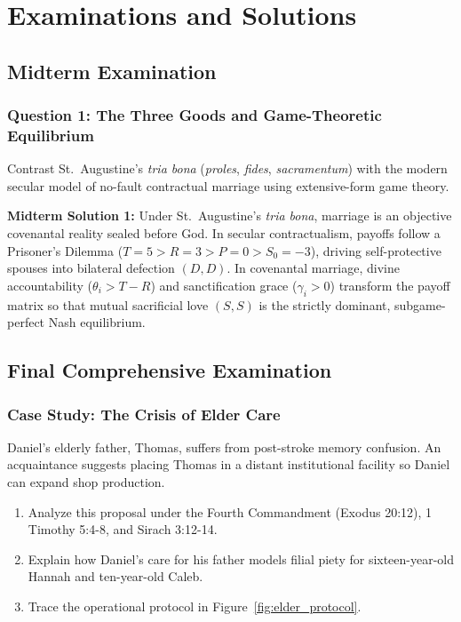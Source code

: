 \documentclass[11pt]{report}
\begin{document}
\chapter{Examinations and Solutions}

\section{Midterm Examination}

\subsection*{Question 1: The Three Goods and Game-Theoretic Equilibrium}
Contrast St.~Augustine's \textit{tria bona} (\textit{proles}, \textit{fides}, \textit{sacramentum}) with the modern secular model of no-fault contractual marriage using extensive-form game theory.

\begin{blackboard}
\textbf{Midterm Solution 1:}
Under St.~Augustine's \textit{tria bona}, marriage is an objective covenantal reality sealed before God. In secular contractualism, payoffs follow a Prisoner's Dilemma ($T = 5 > R = 3 > P = 0 > S_0 = -3$), driving self-protective spouses into bilateral defection $(D,D)$. In covenantal marriage, divine accountability ($\theta_i > T - R$) and sanctification grace ($\gamma_i > 0$) transform the payoff matrix so that mutual sacrificial love $(S,S)$ is the strictly dominant, subgame-perfect Nash equilibrium.
\end{blackboard}

\section{Final Comprehensive Examination}

\subsection*{Case Study: The Crisis of Elder Care}
Daniel's elderly father, Thomas, suffers from post-stroke memory confusion. An acquaintance suggests placing Thomas in a distant institutional facility so Daniel can expand shop production.
\begin{enumerate}
    \item Analyze this proposal under the Fourth Commandment (Exodus 20:12), 1 Timothy 5:4-8, and Sirach 3:12-14.
    \item Explain how Daniel's care for his father models filial piety for sixteen-year-old Hannah and ten-year-old Caleb.
    \item Trace the operational protocol in Figure~\ref{fig:elder_protocol}.
\end{enumerate}
\end{document}
